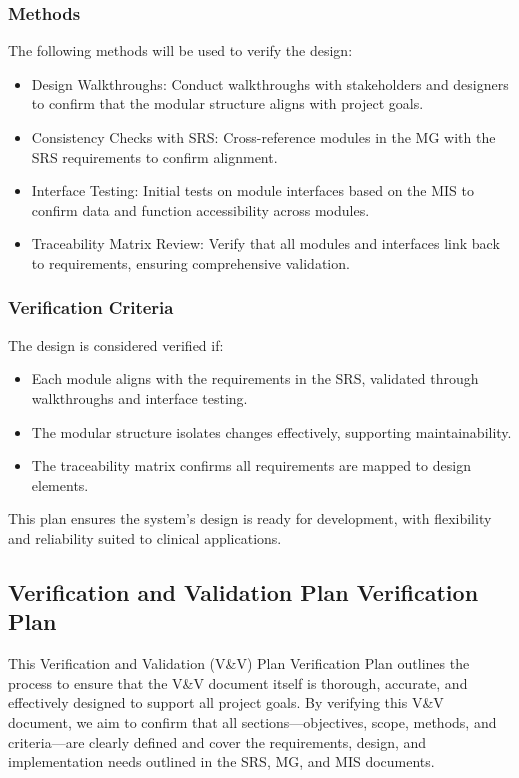 \documentclass[12pt, titlepage]{article}
\begin{document}
\subsubsection{Methods}
The following methods will be used to verify the design:
\begin{itemize}
  \item Design Walkthroughs: Conduct walkthroughs with stakeholders and designers to confirm that the modular structure aligns with project goals.
  \item Consistency Checks with SRS: Cross-reference modules in the MG with the SRS requirements to confirm alignment.
  \item Interface Testing: Initial tests on module interfaces based on the MIS to confirm data and function accessibility across modules.
  \item Traceability Matrix Review: Verify that all modules and interfaces link back to requirements, ensuring comprehensive validation.
\end{itemize}

\subsubsection{Verification Criteria}
The design is considered verified if:
\begin{itemize}
  \item Each module aligns with the requirements in the SRS, validated through walkthroughs and interface testing.
  \item The modular structure isolates changes effectively, supporting maintainability.
  \item The traceability matrix confirms all requirements are mapped to design elements.
\end{itemize}
This plan ensures the system’s design is ready for development, with flexibility and reliability suited to clinical applications.

\subsection{Verification and Validation Plan Verification Plan}

This Verification and Validation (V\&V) Plan Verification Plan outlines the process to ensure that the V\&V document itself is thorough, accurate, and effectively designed to support all project goals. By verifying this V\&V document, we aim to confirm that all sections—objectives, scope, methods, and criteria—are clearly defined and cover the requirements, design, and implementation needs outlined in the SRS, MG, and MIS documents.
\end{document}
